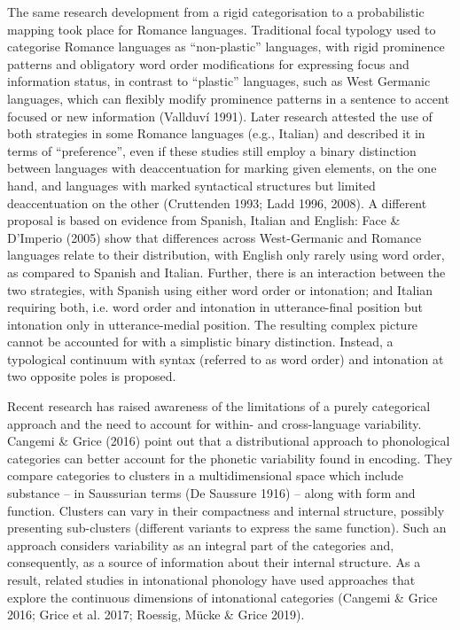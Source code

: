 \begin{styleStandard}
The same research development from a rigid categorisation to a probabilistic mapping took place for Romance languages. Traditional focal typology used to categorise Romance languages as “non-plastic” languages, with rigid prominence patterns and obligatory word order modifications for expressing focus and information status, in contrast to “plastic” languages, such as West Germanic languages, which can flexibly modify prominence patterns in a sentence to accent focused or new information (Vallduví 1991). Later research attested the use of both strategies in some Romance languages (e.g., Italian) and described it in terms of “preference”, even if these studies still employ a binary distinction between languages with deaccentuation for marking given elements, on the one hand, and languages with marked syntactical structures but limited deaccentuation on the other (Cruttenden 1993; Ladd 1996, 2008). A different proposal is based on evidence from Spanish, Italian and English: Face \& D’Imperio (2005) show that differences across West-Germanic and Romance languages relate to their distribution, with English only rarely using word order, as compared to Spanish and Italian. Further, there is an interaction between the two strategies, with Spanish using either word order or intonation; and Italian requiring both, i.e. word order and intonation in utterance-final position but intonation only in utterance-medial position. The resulting complex picture cannot be accounted for with a simplistic binary distinction. Instead, a typological continuum with syntax (referred to as word order) and intonation at two opposite poles is proposed.
\end{styleStandard}

\begin{styleStandard}
Recent research has raised awareness of the limitations of a purely categorical approach and the need to account for within- and cross-language variability. Cangemi \& Grice (2016) point out that a distributional approach to phonological categories can better account for the phonetic variability found in encoding. They compare categories to clusters in a multidimensional space which include substance – in Saussurian terms (De Saussure 1916) – along with form and function. Clusters can vary in their compactness and internal structure, possibly presenting sub-clusters (different variants to express the same function). Such an approach considers variability as an integral part of the categories and, consequently, as a source of information about their internal structure. As a result, related studies in intonational phonology have used approaches that explore the continuous dimensions of intonational categories (Cangemi \& Grice 2016; Grice et al. 2017; Roessig, Mücke \& Grice 2019).
\end{styleStandard}

